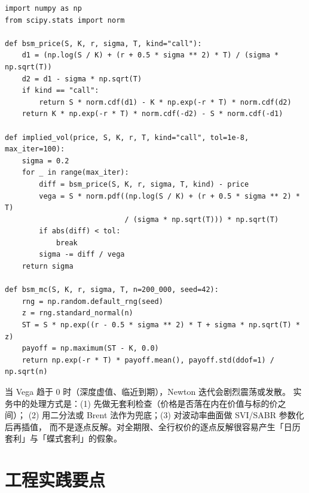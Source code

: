 \begin{lstlisting}[style=pythonstyle,
  caption={Black--Scholes 定价、Newton 法反解隐含波动率与蒙特卡洛验证},
  label={lst:bsm}]
import numpy as np
from scipy.stats import norm

def bsm_price(S, K, r, sigma, T, kind="call"):
    d1 = (np.log(S / K) + (r + 0.5 * sigma ** 2) * T) / (sigma * np.sqrt(T))
    d2 = d1 - sigma * np.sqrt(T)
    if kind == "call":
        return S * norm.cdf(d1) - K * np.exp(-r * T) * norm.cdf(d2)
    return K * np.exp(-r * T) * norm.cdf(-d2) - S * norm.cdf(-d1)

def implied_vol(price, S, K, r, T, kind="call", tol=1e-8, max_iter=100):
    sigma = 0.2
    for _ in range(max_iter):
        diff = bsm_price(S, K, r, sigma, T, kind) - price
        vega = S * norm.pdf((np.log(S / K) + (r + 0.5 * sigma ** 2) * T)
                            / (sigma * np.sqrt(T))) * np.sqrt(T)
        if abs(diff) < tol:
            break
        sigma -= diff / vega
    return sigma

def bsm_mc(S, K, r, sigma, T, n=200_000, seed=42):
    rng = np.random.default_rng(seed)
    z = rng.standard_normal(n)
    ST = S * np.exp((r - 0.5 * sigma ** 2) * T + sigma * np.sqrt(T) * z)
    payoff = np.maximum(ST - K, 0.0)
    return np.exp(-r * T) * payoff.mean(), payoff.std(ddof=1) / np.sqrt(n)
\end{lstlisting}

\begin{warningbox}
当 Vega 趋于 0 时（深度虚值、临近到期），Newton 迭代会剧烈震荡或发散。
实务中的处理方式是：(1) 先做无套利检查（价格是否落在内在价值与标的价之间）；
(2) 用二分法或 Brent 法作为兜底；(3) 对波动率曲面做 SVI/SABR 参数化后再插值，
而不是逐点反解。对全期限、全行权价的逐点反解很容易产生「日历套利」与「蝶式套利」的假象。
\end{warningbox}

\section{工程实践要点}

